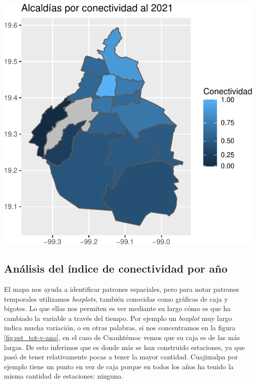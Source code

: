 \documentclass[
  spanish,
]{article}
\begin{document}
\begin{center}\includegraphics{proyecto_files/figure-latex/unnamed-chunk-25-1} \end{center}

\hypertarget{anuxe1lisis-del-uxedndice-de-conectividad-por-auxf1o}{%
\subsection{Análisis del índice de conectividad por
año}\label{anuxe1lisis-del-uxedndice-de-conectividad-por-auxf1o}}

El mapa nos ayuda a identificar patrones espaciales, pero para notar
patrones temporales utilizamos \textit{boxplots}, también conocidas como
gráficas de caja y bigotes. Lo que ellas nos permiten es ver mediante su
largo cómo es que ha cambiado la variable a través del tiempo. Por
ejemplo un \textit{boxplot} muy largo indica mucha variación, o en otras
palabras, si nos concentramos en la figura \ref{fig:est_tot-v-ano}, en
el caso de Cuauhtémoc vemos que su caja es de las más largas. De esto
inferimos que es donde más se han construido estaciones, ya que pasó de
tener relativamente pocas a tener la mayor cantidad. Cuajimalpa por
ejemplo tiene un punto en vez de caja porque en todos los años ha tenido
la misma cantidad de estaciones: ninguna.
\end{document}
